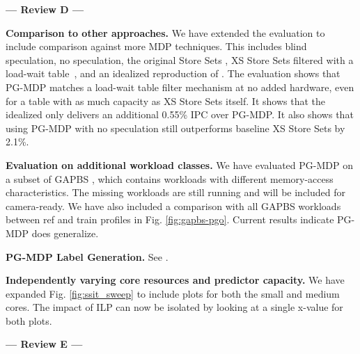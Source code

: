 \vspace{-0.2cm}
\begin{center}
\textbf{--- Review D ---}
\end{center}
\vspace{-0.2cm}

 \textbf{Comparison to other approaches.} We have extended the evaluation to include comparison against more MDP techniques. This includes blind speculation, no speculation, the original Store Sets \cite{storesets}, XS Store Sets filtered with a load-wait table~\cite{kessler1999alpha}, and an idealized reproduction of \cite{storedistance}. The evaluation shows that PG-MDP matches a load-wait table filter mechanism at no added hardware, even for a table with as much capacity as XS Store Sets itself. It shows that the idealized \cite{storedistance} only delivers an additional 0.55\% IPC over PG-MDP. It also shows that using PG-MDP with no speculation still outperforms baseline XS Store Sets by 2.1\%.

 \textbf{Evaluation on additional workload classes.} We have evaluated PG-MDP on a subset of GAPBS \cite{gapbs}, which contains workloads with different memory-access characteristics. The missing workloads are still running and will be included for camera-ready. We have also included a comparison with all GAPBS workloads between ref and train profiles in Fig. \ref{fig:gapbs-pgo}. Current results indicate PG-MDP does generalize.

 \textbf{PG-MDP Label Generation.} %
See .

 \textbf{Independently varying core resources and predictor capacity.} We have expanded Fig. \ref{fig:ssit_sweep} to include plots for both the small and medium cores. The impact of ILP can now be isolated by looking at a single x-value for both plots.

\vspace{-0.2cm}
\begin{center}
\textbf{--- Review E ---}
\end{center}
\vspace{-0.2cm}

